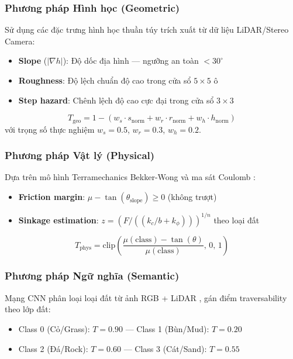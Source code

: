 \documentclass[12pt, a4paper]{article}
\begin{document}
\subsubsection{Phương pháp Hình học (Geometric)}
Sử dụng các đặc trưng hình học thuần túy trích xuất từ dữ liệu LiDAR/Stereo Camera:
\begin{itemize}
    \item \textbf{Slope} ($|\nabla h|$): Độ dốc địa hình --- ngưỡng an toàn $< 30^\circ$
    \item \textbf{Roughness}: Độ lệch chuẩn độ cao trong cửa sổ $5\times5$ ô
    \item \textbf{Step hazard}: Chênh lệch độ cao cực đại trong cửa sổ $3\times3$
\end{itemize}
\begin{equation}
    T_{\text{geo}} = 1 - (w_s \cdot s_{\text{norm}} + w_r \cdot r_{\text{norm}} + w_h \cdot h_{\text{norm}})
\end{equation}
với trọng số thực nghiệm $w_s = 0.5$, $w_r = 0.3$, $w_h = 0.2$.

\subsubsection{Phương pháp Vật lý (Physical)}
Dựa trên mô hình Terramechanics Bekker-Wong \cite{bekker1956} và ma sát Coulomb \cite{higa2019}:
\begin{itemize}
    \item \textbf{Friction margin}: $\mu - \tan(\theta_{\text{slope}}) \geq 0$ (không trượt)
    \item \textbf{Sinkage estimation}: $z = (F / ((k_c/b + k_\phi)))^{1/n}$ theo loại đất
\end{itemize}
\begin{equation}
    T_{\text{phys}} = \text{clip}\left(\frac{\mu(\text{class}) - \tan(\theta)}{\mu(\text{class})},\, 0,\, 1\right)
\end{equation}

\subsubsection{Phương pháp Ngữ nghĩa (Semantic)}
Mạng CNN phân loại loại đất từ ảnh RGB + LiDAR \cite{jiang2021rellis}, gán điểm traversability theo lớp đất:
\begin{itemize}
    \item Class 0 (Cỏ/Grass): $T = 0.90$ --- Class 1 (Bùn/Mud): $T = 0.20$
    \item Class 2 (Đá/Rock): $T = 0.60$ --- Class 3 (Cát/Sand): $T = 0.55$
\end{itemize}
\end{document}
